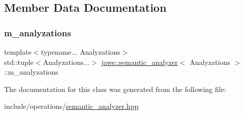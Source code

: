 \subsection{Member Data Documentation}
\mbox{\label{classjawe_1_1semantic__analyzer_aef7214fcda1e7f3f97bb8af44de645da}} 
\subsubsection{\texorpdfstring{m\+\_\+analyzations}{m\_analyzations}}
{\footnotesize\ttfamily template$<$typename... Analyzations$>$ \\
std\+::tuple$<$Analyzations...$>$ \hyperlink{classjawe_1_1semantic__analyzer}{jawe\+::semantic\+\_\+analyzer}$<$ Analyzations $>$\+::m\+\_\+analyzations\hspace{0.3cm}{\ttfamily [private]}}



The documentation for this class was generated from the following file\+:\begin{DoxyCompactItemize}
\item 
include/operations/\hyperlink{semantic__analyzer_8hpp}{semantic\+\_\+analyzer.\+hpp}\end{DoxyCompactItemize}
